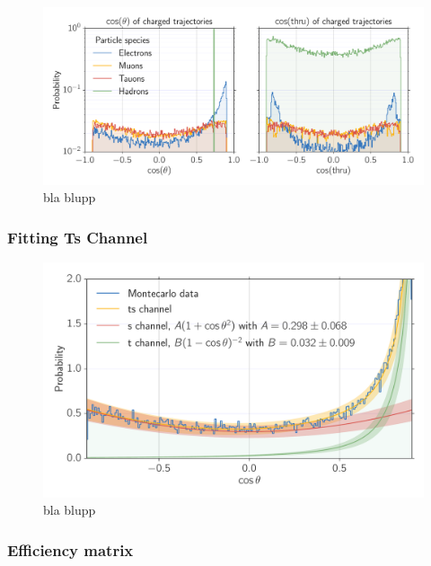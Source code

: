 \begin{figure}[htpb]
    \centering
    \includegraphics[width=1.0\linewidth]{figures/cos_figs}
    \caption{bla blupp}
    \label{fig:cos_figs}
\end{figure}
\newpage
\subsubsection{Fitting Ts Channel}
\label{ssub:FittingTsChannel}

\begin{figure}[htpb]
    \centering
    \includegraphics[width=1.0\linewidth]{figures/tschannel}
    \caption{bla blupp}
    \label{fig:tschannel}
\end{figure}

\subsubsection{Efficiency matrix}
\label{ssub:Efficiencymatrix}


